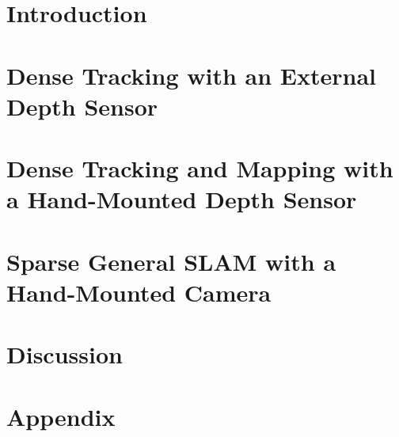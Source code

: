 \documentclass[12pt]{cmuthesis}
\begin{document}
\chapter{Introduction}  
\chapter{Dense Tracking with an External Depth Sensor} 
\chapter{Dense Tracking and Mapping with a Hand-Mounted Depth Sensor} 
\chapter{Sparse General SLAM
		 with a Hand-Mounted Camera} 
\chapter{Discussion} 
  
\appendix
\chapter{Appendix} 

\backmatter


\renewcommand{\bibsection}{\chapter{\bibname}}

\end{document}
